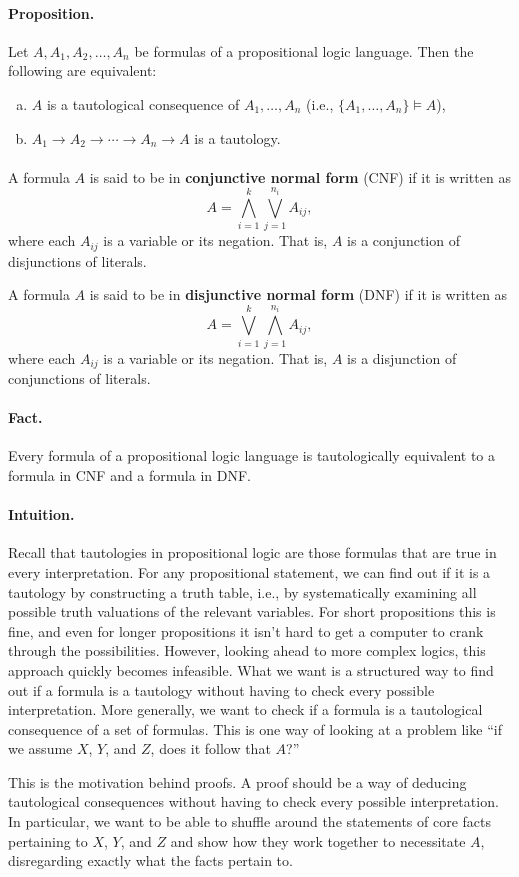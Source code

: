 \documentclass[12pt]{article}
\newlength{\myparskip}
\newenvironment{fullbox}{\begin{lrbox}{\savefullbox}\begin{minipage}{\dimexpr\textwidth-2\fboxsep\relax}\setlength{\parskip}{\myparskip}}{\end{minipage}\end{lrbox}\framebox[\textwidth]{\usebox{\savefullbox}}}
\newenvironment{pbox}[1][]{\begin{fullbox}\def\temp{#1}\ifx\temp\empty\else\paragraph{#1}\phantom{}\fi}{\end{fullbox}}
\theoremstyle{definition}
\newcommand{\<}{\langle}
\renewcommand{\>}{\rangle}
\newcommand{\keyword}{\textbf}
\begin{document}
\begin{pbox}[Proposition.]
    Let $A, A_1, A_2, \dots, A_n$ be formulas of a propositional logic language.
    Then the following are equivalent:
    \begin{enumerate}[(a)]
        \item $A$ is a tautological consequence of $A_1, \dots, A_n$ (i.e., $\{A_1, \dots, A_n\} \vDash A$),
        \item $A_1 \to A_2 \to \cdots \to A_n \to A$ is a tautology.
    \end{enumerate}
\end{pbox}

\begin{pbox}
    A formula $A$ is said to be in \keyword{conjunctive normal form} (CNF) if it is written as
    \[
        A = \bigwedge_{i=1}^{k} \bigvee_{j=1}^{n_i} A_{ij},
    \]
    where each $A_{ij}$ is a variable or its negation.
    That is, $A$ is a conjunction of disjunctions of literals.

    A formula $A$ is said to be in \keyword{disjunctive normal form} (DNF) if it is written as
    \[
        A = \bigvee_{i=1}^{k} \bigwedge_{j=1}^{n_i} A_{ij},
    \]
    where each $A_{ij}$ is a variable or its negation.
    That is, $A$ is a disjunction of conjunctions of literals.
\end{pbox}

\begin{pbox}[Fact.]
    Every formula of a propositional logic language is tautologically equivalent to a formula in CNF and a formula in DNF.
\end{pbox}

\begin{pbox}[Intuition.]
    Recall that tautologies in propositional logic are those formulas that are true in every interpretation.
    For any propositional statement, we can find out if it is a tautology by constructing a truth table, i.e., by systematically examining all possible truth valuations of the relevant variables.
    For short propositions this is fine, and even for longer propositions it isn't hard to get a computer to crank through the possibilities.
    However, looking ahead to more complex logics, this approach quickly becomes infeasible.
    What we want is a structured way to find out if a formula is a tautology without having to check every possible interpretation.
    More generally, we want to check if a formula is a tautological consequence of a set of formulas.
    This is one way of looking at a problem like ``if we assume $X$, $Y$, and $Z$, does it follow that $A$?''

    This is the motivation behind proofs.
    A proof should be a way of deducing tautological consequences without having to check every possible interpretation.
    In particular, we want to be able to shuffle around the statements of core facts pertaining to $X$, $Y$, and $Z$ and show how they work together to necessitate $A$, disregarding exactly what the facts pertain to. 
\end{pbox}
\end{document}
